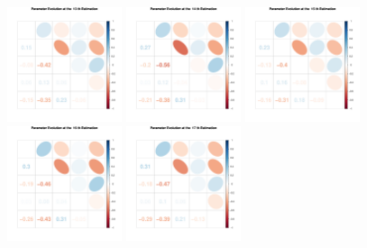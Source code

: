 \clearpage
\begin{figure}[h]
\centering
\includegraphics[width=0.3\textwidth,height=0.2\textheight]{Chapters/05MCMCOU/plots/paraEvolution/corMatrix13.pdf}
\includegraphics[width=0.3\textwidth,height=0.2\textheight]{Chapters/05MCMCOU/plots/paraEvolution/corMatrix14.pdf}
\includegraphics[width=0.3\textwidth,height=0.2\textheight]{Chapters/05MCMCOU/plots/paraEvolution/corMatrix15.pdf}
\includegraphics[width=0.3\textwidth,height=0.2\textheight]{Chapters/05MCMCOU/plots/paraEvolution/corMatrix16.pdf}
\includegraphics[width=0.3\textwidth,height=0.2\textheight]{Chapters/05MCMCOU/plots/paraEvolution/corMatrix17.pdf}

\end{figure}
